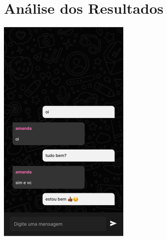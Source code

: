 \chapter{Análise dos Resultados}
\label{ch:resultados}


\includegraphics{figuras/mjmb943u.png}




